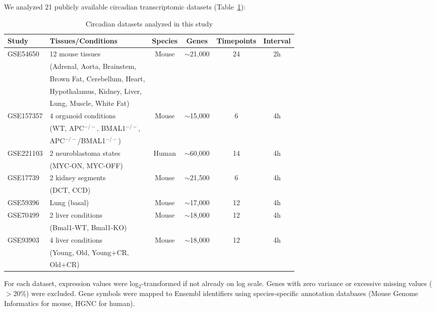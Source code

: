 \documentclass[11pt,a4paper]{article}
\begin{document}
We analyzed 21 publicly available circadian transcriptomic datasets (Table~\ref{tab:datasets}):

\begin{table}[H]
\centering
\caption{Circadian datasets analyzed in this study}
\label{tab:datasets}
\begin{tabular}{llcccc}
\toprule
Study & Tissues/Conditions & Species & Genes & Timepoints & Interval \\
\midrule
GSE54650 & 12 mouse tissues & Mouse & $\sim$21,000 & 24 & 2h \\
         & (Adrenal, Aorta, Brainstem, & & & & \\
         & Brown Fat, Cerebellum, Heart, & & & & \\
         & Hypothalamus, Kidney, Liver, & & & & \\
         & Lung, Muscle, White Fat) & & & & \\
\midrule
GSE157357 & 4 organoid conditions & Mouse & $\sim$15,000 & 6 & 4h \\
          & (WT, APC$^{-/-}$, BMAL1$^{-/-}$, & & & & \\
          & APC$^{-/-}$/BMAL1$^{-/-}$) & & & & \\
\midrule
GSE221103 & 2 neuroblastoma states & Human & $\sim$60,000 & 14 & 4h \\
          & (MYC-ON, MYC-OFF) & & & & \\
\midrule
GSE17739 & 2 kidney segments & Mouse & $\sim$21,500 & 6 & 4h \\
         & (DCT, CCD) & & & & \\
\midrule
GSE59396 & Lung (basal) & Mouse & $\sim$17,000 & 12 & 4h \\
\midrule
GSE70499 & 2 liver conditions & Mouse & $\sim$18,000 & 12 & 4h \\
         & (Bmal1-WT, Bmal1-KO) & & & & \\
\midrule
GSE93903 & 4 liver conditions & Mouse & $\sim$18,000 & 12 & 4h \\
         & (Young, Old, Young+CR, & & & & \\
         & Old+CR) & & & & \\
\bottomrule
\end{tabular}
\end{table}

For each dataset, expression values were log$_2$-transformed if not already on log scale. Genes with zero variance or excessive missing values ($>$20\%) were excluded. Gene symbols were mapped to Ensembl identifiers using species-specific annotation databases (Mouse Genome Informatics for mouse, HGNC for human).
\end{document}
